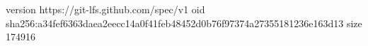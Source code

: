 version https://git-lfs.github.com/spec/v1
oid sha256:a34fef6363daea2eecc14a0f41feb48452d0b76f97374a27355181236e163d13
size 174916
